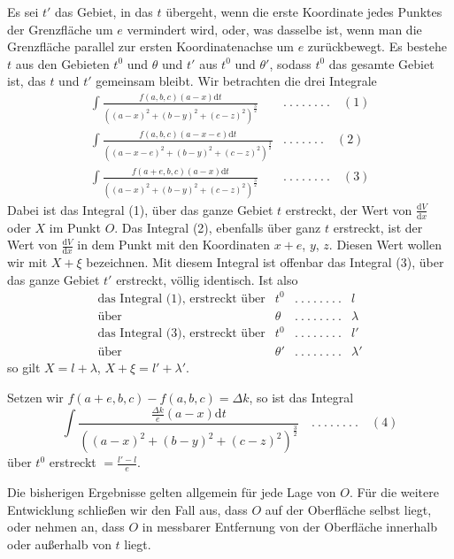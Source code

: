 Es sei $t'$ das Gebiet, in das $t$ übergeht, wenn die erste Koordinate jedes Punktes der Grenzfläche um $e$ vermindert wird, oder, was dasselbe ist, wenn man die Grenzfläche parallel zur ersten Koordinatenachse um $e$ zurückbewegt. Es bestehe $t$ aus den Gebieten $t^0$ und $\theta$ und $t'$ aus $t^0$ und $\theta'$, sodass $t^0$ das gesamte Gebiet ist, das $t$ und $t'$ gemeinsam bleibt. Wir betrachten die drei Integrale
\[
\begin{array}{ll}
\displaystyle\int\frac{f(a,b,c)(a-x)\mathrm{d}t}{((a-x)^2+(b-y)^2+(c-z)^2)^{\frac{3}{2}}}&.\ .\ .\ .\ .\ .\ .\ .\quad(1)\\[8pt]
\displaystyle\int\frac{f(a,b,c)(a-x-e)\mathrm{d}t}{((a-x-e)^2+(b-y)^2+(c-z)^2)^{\frac{3}{2}}}&.\ .\ .\ .\ .\ .\ .\quad(2)\\[8pt]
\displaystyle\int\frac{f(a+e,b,c)(a-x)\mathrm{d}t}{((a-x)^2+(b-y)^2+(c-z)^2)^{\frac{3}{2}}}&.\ .\ .\ .\ .\ .\ .\ .\quad(3)
\end{array}
\]
Dabei ist das Integral (1), über das ganze Gebiet $t$ erstreckt, der Wert von $\frac{\mathrm{d}V}{\mathrm{d}x}$ oder $X$ im Punkt $O$. Das Integral (2), ebenfalls über ganz $t$ erstreckt, ist der Wert von $\frac{\mathrm{d}V}{\mathrm{d}x}$ in dem Punkt mit den Koordinaten $x+e$, $y$, $z$. Diesen Wert wollen wir mit $X+\xi$ bezeichnen. Mit diesem Integral ist offenbar das Integral (3), über das ganze Gebiet $t'$ erstreckt, völlig identisch. Ist also
%
\[
\begin{array}{rlcl}
\text{das Integral (1), erstreckt über}&t^0&.\ .\ .\ .\ .\ .\ .\ .&l\\
\text{über}&\theta&.\ .\ .\ .\ .\ .\ .\ .&\lambda\\
\text{das Integral (3), erstreckt über}&t^0&.\ .\ .\ .\ .\ .\ .\ .&l'\\
\text{über}&\theta'&.\ .\ .\ .\ .\ .\ .\ .&\lambda'
\end{array}
\]
so gilt $X=l+\lambda$, $X+\xi=l'+\lambda'$.

Setzen wir $f(a+e,b,c)-f(a,b,c)=\Delta k$, so ist das Integral
\[
\int\frac{\frac{\Delta k}{e}(a-x)\mathrm{d}t}{((a-x)^2+(b-y)^2+(c-z)^2)^{\frac{3}{2}}}\quad .\ .\ .\ .\ .\ .\ .\ .\quad(4)
\]
über $t^0$ erstreckt $=\frac{l'-l}{e}$.

Die bisherigen Ergebnisse gelten allgemein für jede Lage von $O$. Für die weitere Entwicklung schließen wir den Fall aus, dass $O$ auf der Oberfläche selbst liegt, oder nehmen an, dass $O$ in messbarer Entfernung von der Oberfläche innerhalb oder außerhalb von $t$ liegt.

